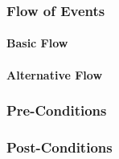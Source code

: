 \documentclass[a4paper,12pt]{article}
\begin{document}
\subsubsection{Flow of Events}
\paragraph{Basic Flow}
\begin{itemize}
\end{itemize}

\paragraph{Alternative Flow}
\begin{itemize}
\end{itemize}

\subsubsection{Pre-Conditions}
\subsubsection{Post-Conditions}

 
\end{document}
